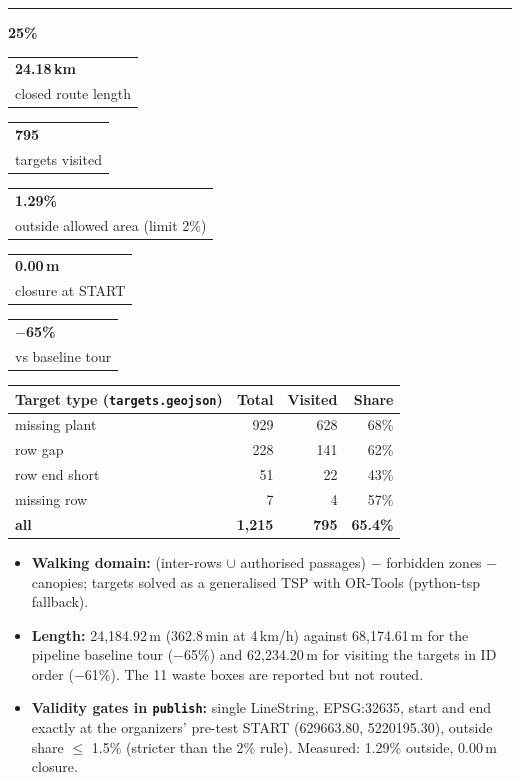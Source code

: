 \documentclass[10pt,a4paper]{article}
\makeatletter
\newcommand{\crit}[3]{%
  \par\vspace{7pt}%
  {\color{#1}\rule[-2pt]{6pt}{12pt}}\hspace{5pt}{\large\bfseries\color{night}#2}\hfill{\bfseries\color{#1}#3}\par
  \vspace{-2pt}{\color{#1}\rule{\linewidth}{0.8pt}}\par\vspace{2pt}}
\newcommand{\kpi}[2]{\begin{tabular}[t]{@{}l@{}}{\Large\bfseries\color{night}#1}\\[-1pt]{\scriptsize\color{muted}#2}\end{tabular}}
\makeatother
\begin{document}
\crit{cRou}{Route}{25\%}
\kpi{24.18\,km}{closed route length}\hfill
\kpi{795}{targets visited}\hfill
\kpi{1.29\%}{outside allowed area (limit 2\%)}\hfill
\kpi{0.00\,m}{closure at START}\hfill
\kpi{$-$65\%}{vs baseline tour}
\par\vspace{3pt}
{\small
\begin{tabularx}{\linewidth}{@{}Y r r r@{}}
  \toprule
  \textbf{Target type} (\texttt{targets.geojson}) & \textbf{Total} & \textbf{Visited} & \textbf{Share} \\
  \midrule
  missing plant & 929 & 628 & 68\% \\
  row gap & 228 & 141 & 62\% \\
  row end short & 51 & 22 & 43\% \\
  missing row & 7 & 4 & 57\% \\
  \midrule
  \textbf{all} & \textbf{1,215} & \textbf{795} & \textbf{65.4\%} \\
  \bottomrule
\end{tabularx}
\par\vspace{2pt}
\begin{itemize}
  \item \textbf{Walking domain:} (inter-rows $\cup$ authorised passages) $-$ forbidden zones $-$ canopies; targets solved as a generalised TSP with OR-Tools (python-tsp fallback).
  \item \textbf{Length:} 24,184.92\,m (362.8\,min at 4\,km/h) against 68,174.61\,m for the pipeline baseline tour ($-$65\%) and 62,234.20\,m for visiting the targets in ID order ($-$61\%). The 11 waste boxes are reported but not routed.
  \item \textbf{Validity gates in \texttt{publish}:} single LineString, EPSG:32635, start and end exactly at the organizers' pre-test START (629663.80, 5220195.30), outside share $\leq$ 1.5\% (stricter than the 2\% rule). Measured: 1.29\% outside, 0.00\,m closure.
\end{itemize}}
\end{document}
